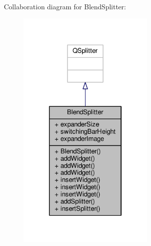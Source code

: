 Collaboration diagram for Blend\+Splitter\+:
\nopagebreak
\begin{figure}[H]
\begin{center}
\leavevmode
\includegraphics[width=190pt]{class_blend_splitter__coll__graph}
\end{center}
\end{figure}

